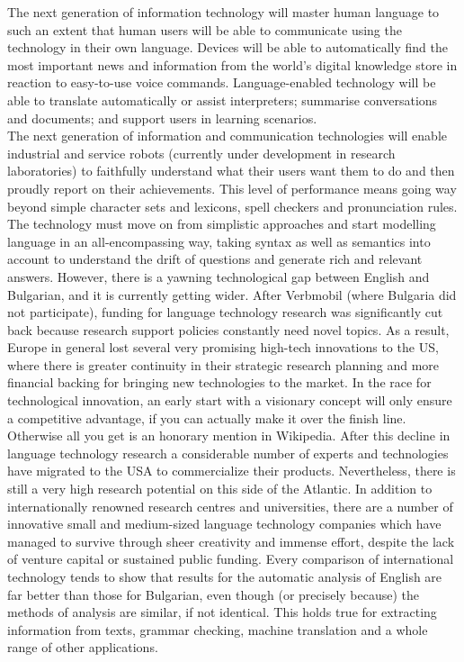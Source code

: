 \begin{multicols}{2}
The next generation of information technology will master human language to such an extent that human users will be able to communicate using the technology in their own language. Devices will be able to automatically find the most important news and information from the world’s digital knowledge store in reaction to easy-to-use voice commands. Language-enabled technology will be able to translate automatically or assist interpreters; summarise conversations and documents; and support users in learning scenarios. \\
The next generation of information and communication technologies will enable industrial and service robots (currently under development in research laboratories) to faithfully understand what their users want them to do and then proudly report on their achievements. This level of performance means going way beyond simple character sets and lexicons, spell checkers and pronunciation rules. The technology must move on from simplistic approaches and start modelling language in an all-encompassing way, taking syntax as well as semantics into account to understand the drift of questions and generate rich and relevant answers.
However, there is a yawning technological gap between English and Bulgarian, and it is currently getting wider. After Verbmobil (where Bulgaria did not participate), funding for language technology research was significantly cut back because research support policies constantly need novel topics. As a result, Europe in general lost several very promising high-tech innovations to the US, where there is greater continuity in their strategic research planning and more financial backing for bringing new technologies to the market. In the race for technological innovation, an early start with a visionary concept will only ensure a competitive advantage, if you can actually make it over the finish line. Otherwise all you get is an honorary mention in Wikipedia. 
After this decline in language technology research a considerable number of experts and technologies have migrated to the USA to commercialize their products. Nevertheless, there is still a very high research potential on this side of the Atlantic. In addition to internationally renowned research centres and universities, there are a number of innovative small and medium-sized language technology companies which have managed to survive through sheer creativity and immense effort, despite the lack of venture capital or sustained public funding. 
Every comparison of international technology tends to show that results for the automatic analysis of English are far better than those for Bulgarian, even though (or precisely because) the methods of analysis are similar, if not identical. This holds true for extracting information from texts, grammar checking, machine translation and a whole range of other applications. \\

\end{multicols}
